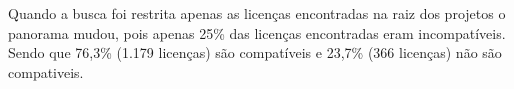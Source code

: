 Quando a busca foi restrita apenas as licenças encontradas na raiz dos projetos o panorama mudou, pois apenas 25\% das licenças encontradas eram incompatíveis. Sendo que 76,3\% (1.179 licenças) são compatíveis e 23,7\% (366 licenças) não são compativeis.

